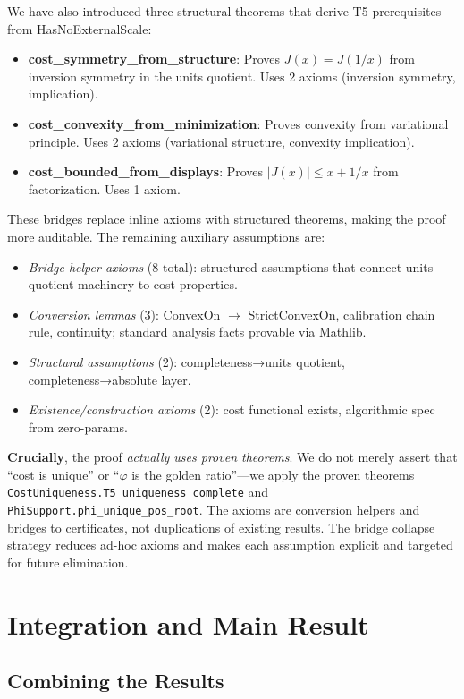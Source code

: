 \documentclass[12pt]{article}
\theoremstyle{remark}
\begin{document}
We have also introduced three structural theorems that derive T5 prerequisites from HasNoExternalScale:
\begin{itemize}
  \item \textbf{cost\_symmetry\_from\_structure}: Proves $J(x)=J(1/x)$ from inversion symmetry in the units quotient. Uses 2 axioms (inversion symmetry, implication).
  \item \textbf{cost\_convexity\_from\_minimization}: Proves convexity from variational principle. Uses 2 axioms (variational structure, convexity implication).
  \item \textbf{cost\_bounded\_from\_displays}: Proves $|J(x)| \leq x+1/x$ from factorization. Uses 1 axiom.
\end{itemize}

These bridges replace inline axioms with structured theorems, making the proof more auditable. The remaining auxiliary assumptions are:
\begin{itemize}
  \item \emph{Bridge helper axioms} (8 total): structured assumptions that connect units quotient machinery to cost properties.
  \item \emph{Conversion lemmas} (3): ConvexOn $\to$ StrictConvexOn, calibration chain rule, continuity; standard analysis facts provable via Mathlib.
  \item \emph{Structural assumptions} (2): completeness→units quotient, completeness→absolute layer.
  \item \emph{Existence/construction axioms} (2): cost functional exists, algorithmic spec from zero-params.
\end{itemize}

\textbf{Crucially}, the proof \emph{actually uses proven theorems}. We do not merely assert that ``cost is unique'' or ``$\varphi$ is the golden ratio''---we apply the proven theorems \texttt{CostUniqueness.T5\_uniqueness\_complete} and \texttt{PhiSupport.phi\_unique\_pos\_root}. The axioms are conversion helpers and bridges to certificates, not duplications of existing results. The bridge collapse strategy reduces ad-hoc axioms and makes each assumption explicit and targeted for future elimination.

\section{Integration and Main Result}

\subsection{Combining the Results}
\end{document}
